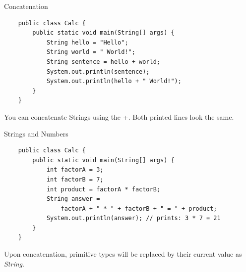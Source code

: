 \begin{frame}[fragile]{Concatenation}
	\begin{lstlisting}
	public class Calc {
	    public static void main(String[] args) {
	        String hello = "Hello";
	        String world = " World!";
	        String sentence = hello + world;
	        System.out.println(sentence);
	        System.out.println(hello + " World!");
	    }
	}
	\end{lstlisting}
	You can concatenate Strings using the +. Both printed lines look the same.
\end{frame}

\begin{frame}[fragile]{Strings and Numbers}
	\begin{lstlisting}
	public class Calc {
	    public static void main(String[] args) {
	    	int factorA = 3;
	    	int factorB = 7;
	    	int product = factorA * factorB;
	    	String answer = 
	            factorA + " * " + factorB + " = " + product;
	        System.out.println(answer); // prints: 3 * 7 = 21
	    }
	}
	\end{lstlisting}
	Upon concatenation, primitive types will be replaced by their current value as \emph{String}.
\end{frame}

